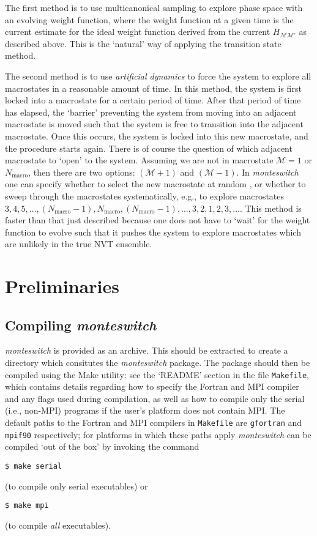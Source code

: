 \documentclass{report}
\begin{document}
The first method is to use multicanonical sampling to explore phase space with an evolving weight function, where the weight function
at a given time is the current estimate for the ideal weight function derived from the current $H_{\mathcal{M}\mathcal{M}'}$ as described above.
This is the `natural' way of applying the transition state method.

The second method is to use \emph{artificial dynamics} to force the system to explore all macrostates in a reasonable amount of time. In this
method, the system is first locked into a macrostate for a certain period of time. After that period of time has elapsed, the `barrier' preventing
the system from moving into an adjacent macrostate is moved such that the system is free to transition into the adjacent macrostate. Once this occurs,
the system is locked into this new macrostate, and the procedure starts again. There is of course the question of which adjacent macrostate to `open'
to the system. Assuming we are not in macrostate $\mathcal{M}=1$ or $N_{\text{macro}}$, then there are two options: $(\mathcal{M}+1)$ and $(\mathcal{M}-1)$.
In \emph{monteswitch} one can specify whether to select the new macrostate at random \cite{thesis:Jackson}, 
or whether to sweep through the macrostates systematically, e.g.,
to explore macrostates $3,4,5,\dotsc,(N_{\text{macro}}-1),N_{\text{macro}},(N_{\text{macro}}-1),\dotsc,3,2,1,2,3,\dotsc$. This method is faster than that
just described because one does not have to `wait' for the weight function to evolve such that it pushes the system to explore macrostates which
are unlikely in the true NVT ensemble.


\chapter{Preliminaries}\label{chapter:preliminaries}

\section{Compiling \emph{monteswitch}}
\emph{monteswitch} is provided as an archive. This should be extracted to create a directory which consitutes the \emph{monteswitch} package. The 
package should then be compiled using the Make utility: see the `README' section in the file \texttt{Makefile}, which contains details regarding how to
specify the Fortran and MPI compiler and any flags used during compilation, as well as how to compile only the serial (i.e., non-MPI) programs
if the user's platform does not contain MPI.
The default paths to the Fortran and MPI compilers in \texttt{Makefile} are \texttt{gfortran} and \texttt{mpif90} respectively; for platforms in which
these paths apply \emph{monteswitch} can be compiled `out of the box' by invoking the command 
\begin{verbatim}
$ make serial
\end{verbatim} 
(to compile only serial executables) or 
\begin{verbatim}
$ make mpi
\end{verbatim}
(to compile \emph{all} executables).
\end{document}

